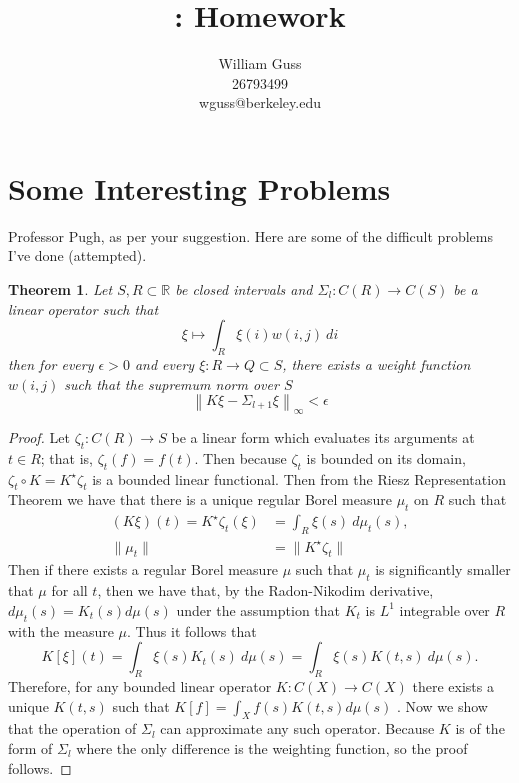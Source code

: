 \documentclass[letter]{article}
\title{\bCLASS: Homework \bHWN}
\author{William Guss\\26793499\\wguss@berkeley.edu}
\newtheorem{theorem}{Theorem}
\begin{document}
\maketitle
\thispagestyle{empty}


\setcounter{section}{1}
\section{Some Interesting Problems}

Professor Pugh, as per your suggestion.
Here are some of the difficult problems I've done (attempted).

 \begin{theorem}
	Let $S,R \subset \mathbb{R}$ be closed intervals and $\Sigma_l : C(R) \to C(S)$ be a linear operator such that $$\xi \mapsto \int_R \xi(i)w(i,j)\ di$$ then for every $\epsilon >0$ and every $\xi : R \to Q \subset S$, there exists a weight function $w(i,j)$ such that the supremum norm over $S$ 
	\begin{equation}
		\left\|K\xi -\Sigma_{l+1}\xi\right\|_{\infty} < \epsilon
	\end{equation}
\end{theorem}
\begin{proof}
	 Let $\zeta_t :C(R)\to S$ be a linear form which evaluates its arguments at $t\in R$; that is, $\zeta_t(f) = f(t)$.  Then because $\zeta_t$ is bounded on its domain, $\zeta_t\circ K = K^\star\zeta_t$ is a bounded linear functional. Then from the Riesz Representation Theorem we have that there is a unique regular Borel measure $\mu_t$ on $R$ such that 
	\begin{equation}
	\begin{aligned}
	    \left(K\xi\right)(t) = K^\star \zeta_t\left(\xi\right) &= \int_{R} \xi(s)\ d\mu_t(s), \\
	    \|\mu_t\| &= \|K^\star \zeta_t\| 
	\end{aligned}
	\end{equation}
	Then if there exists a regular Borel measure $\mu$ such that $\mu_t$ is significantly smaller that $\mu$ for all $t$, then we have that, by the Radon-Nikodim derivative, $d\mu_t(s) = K_t(s)d\mu(s)$ under the assumption that $K_t$ is $L^1$ integrable over $R$ with the measure $\mu$. Thus it follows that 
	\begin{equation}
	K\left[\xi\right](t) = \int_{R} \xi(s)K_t(s)\ d\mu(s) = \int_{R} \xi(s)K(t,s)\  d\mu(s).
	\end{equation}
	Therefore, for any bounded linear operator $K:C(X)\to C(X)$ there exists a unique $K(t,s)$ such that $K[f] = \int_X f(s)K(t,s) d\mu(s)$ . Now we show that the operation of $\Sigma_l$ can approximate any such operator. Because $K$ is of the form of $\Sigma_l$ where the only difference is the weighting function, so the proof follows.
\end{proof}
\end{document}
